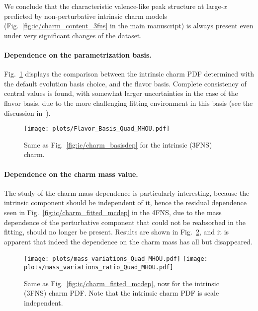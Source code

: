 We conclude that
the characteristic valence-like peak structure at large-$x$
predicted by non-perturbative intrinsic charm models (Fig.~\ref{fig:ic/charm_content_3fns}
in the main manuscript)
is always present even under very significant changes of the dataset.
%

\paragraph{Dependence on the parametrization basis.}
%
Fig.~\ref{fig:ic/charm_basisdep_3FNS} displays
the comparison between the intrinsic charm
PDF determined with the default evolution basis choice, and the flavor
basis. Complete consistency of central values is found, with somewhat
larger uncertainties in the case of the flavor basis, due to the more 
challenging fitting environment in this basis (see the discussion in~\cite{Ball:2021leu}).

\begin{figure}[t!]
  \begin{center}
    \texttt{[image: plots/Flavor\_Basis\_Quad\_MHOU.pdf]}
    \caption{\small Same as Fig.~\ref{fig:ic/charm_basisdep}
    for the intrinsic (3FNS) charm.
  \label{fig:ic/charm_basisdep_3FNS} }
\end{center}
\end{figure}


\paragraph{Dependence on the charm mass value.}
%
The study of the charm mass dependence is particularly interesting,
because the intrinsic component should be independent of it, hence the
residual dependence seen in Fig.~\ref{fig:ic/charm_fitted_mcdep} in the
4FNS, due to the mass dependence of the perturbative component that
could not be reabsorbed in the fitting, should no longer be present. 
Results are shown in
Fig.~\ref{fig:ic/mass_variations_Quad_MHOU}, and it is apparent that
indeed the dependence on the charm mass has all but disappeared.


\begin{figure}[h]
  \begin{center}
\texttt{[image: plots/mass\_variations\_Quad\_MHOU.pdf]}
    \texttt{[image: plots/mass\_variations\_ratio\_Quad\_MHOU.pdf]}
\caption{\small      
 Same as Fig.~\ref{fig:ic/charm_fitted_mcdep}, now for
      the intrinsic (3FNS) charm PDF. Note that the intrinsic charm
      PDF is scale independent.
  \label{fig:ic/mass_variations_Quad_MHOU} }
\end{center}
\end{figure}

